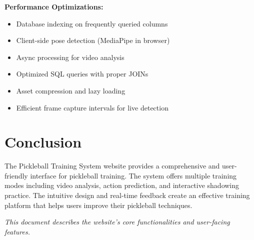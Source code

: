 \documentclass[11pt,a4paper]{article}
\begin{document}
\textbf{Performance Optimizations:}
\begin{itemize}[noitemsep,topsep=0pt]
    \item Database indexing on frequently queried columns
    \item Client-side pose detection (MediaPipe in browser)
    \item Async processing for video analysis
    \item Optimized SQL queries with proper JOINs
    \item Asset compression and lazy loading
    \item Efficient frame capture intervals for live detection
\end{itemize}



\section{Conclusion}

The Pickleball Training System website provides a comprehensive and user-friendly interface for pickleball training. The system offers multiple training modes including video analysis, action prediction, and interactive shadowing practice. The intuitive design and real-time feedback create an effective training platform that helps users improve their pickleball techniques.

\vspace{0.5cm}

\begin{center}
\textit{This document describes the website's core functionalities and user-facing features.}
\end{center}
\end{document}
